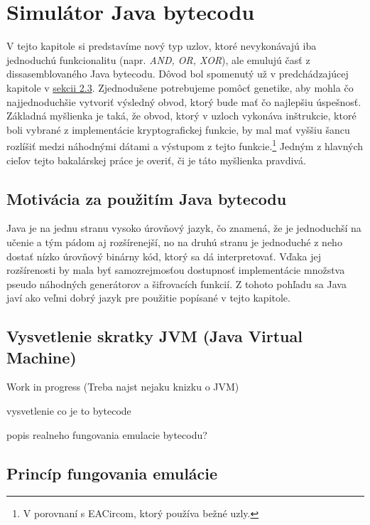 \chapter{Simulátor Java bytecodu}
\label{chap:eacirc-jvmsim}

V tejto kapitole si predstavíme nový typ uzlov, ktoré nevykonávajú iba jednoduchú funkcionalitu (napr. \textit{AND, OR, XOR}), ale emulujú časť z dissasemblovaného Java bytecodu. Dôvod bol spomenutý už v predchádzajúcej kapitole v \hyperref[sec:nodes]{sekcii 2.3}. Zjednodušene potrebujeme pomôcť genetike, aby mohla čo najjednoduchšie vytvoriť výsledný obvod, ktorý bude mať čo najlepšiu úspešnosť. Základná myšlienka je taká, že obvod, ktorý v uzloch vykonáva inštrukcie, ktoré boli vybrané z implementácie kryptografickej funkcie, by mal mať vyššiu šancu rozlíšiť medzi náhodnými dátami a výstupom z tejto funkcie.\footnote{V porovnaní s EACircom, ktorý používa bežné uzly.} Jedným z hlavných cieľov tejto bakalárskej práce je overiť, či je táto myšlienka pravdivá. 

\section{Motivácia za použitím Java bytecodu}
\label{sec:java-bytecode}

Java je na jednu stranu vysoko úrovňový jazyk, čo znamená, že je jednoduchší na učenie a tým pádom aj rozšírenejší, no na druhú stranu je jednoduché z neho dostať nízko úrovňový binárny kód, ktorý sa dá interpretovať. Vďaka jej rozšírenosti  by mala byť samozrejmosťou dostupnosť implementácie množstva pseudo náhodných generátorov a šifrovacích funkcií. Z tohoto pohľadu sa Java javí ako veľmi dobrý jazyk pre použitie popísané v tejto kapitole.

\section{Vysvetlenie skratky JVM (Java Virtual Machine)}
\label{sec:jvm}

Work in progress (Treba najst nejaku knizku o JVM) 

\begin{myItemize} 
\item vysvetlenie co je to bytecode
\item popis realneho fungovania emulacie bytecodu?
\end{myItemize}

\section{Princíp fungovania emulácie}
\label{sec:jvm-principle}

